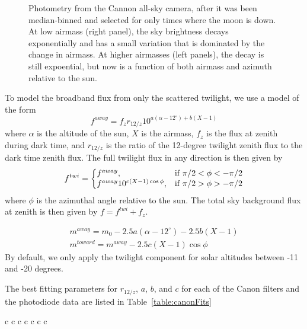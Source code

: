 \documentclass{emulateapj}  %
\begin{document}
{\begin{figure*}
  \caption{Photometry from the Cannon all-sky camera, after it was been median-binned and selected for only times where the moon is down.  At low airmass (right panel), the sky brightness decays exponentially and has a small variation that is dominated by the change in airmass.  At higher airmasses (left panels), the decay is still expoential, but now is a function of both airmass and azimuth relative to the sun.}
\end{figure*}



To model the broadband flux from only the scattered twilight, we use a model of the form
\begin{equation}\label{eqn:twi1}
  f^{away} = f_{z} r_{12/z} 10^{a(\alpha-12^{\circ})+b(X-1)}
\end{equation}
where $\alpha$ is the altitude of the sun, $X$ is the airmass, $f_{z}$ is the flux at zenith during dark time, and $r_{12/z}$ is the ratio of the 12-degree twilight zenith flux to the dark time zenith flux. The full twilight flux in any direction is then given by
\begin{equation}
  \label{eqn:twi}
  f^{twi}  = \left\{
  \begin{array}{@{}ll@{}}
        f^{away}, & \text{if}\  \pi/2 < \phi < -\pi/2   \\
        f^{away} 10^{c (X-1) \cos{\phi}}, &  \text{if}\   \pi/2 > \phi >  -\pi/2
        \end{array} \right.
\end{equation}
where $\phi$ is the azimuthal angle relative to the sun. The total sky background flux at zenith is then given by $f = f^{twi} + f_{z}$.


\begin{eqnarray}
  m^{away} = m_0 -2.5a(\alpha-12^{\circ})-2.5b(X-1) \\
  m^{toward} = m^{away} -2.5c(X-1)\cos{\phi}
\end{eqnarray}
By default, we only apply the twilight component for solar altitudes between -11 and -20 degrees.


The best fitting parameters for $r_{12/z}$, $a$, $b$, and $c$ for each of the Canon filters and the photodiode data are listed in Table~\ref{table:canonFits}

\begin{deluxetable*}{c c c c c c c}
  \tabletypesize{\small }
  \tablewidth{0pt}
  

\end{deluxetable*}}
\end{document}
